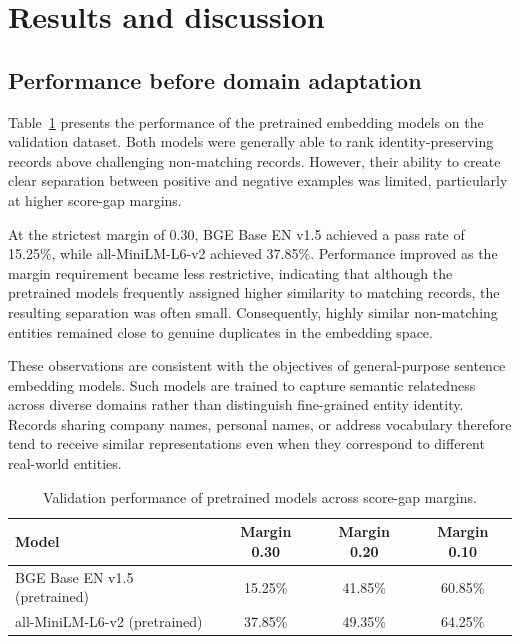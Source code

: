 \documentclass{article}
\begin{document}
\section{Results and discussion}
\label{sec:results}

\subsection{Performance before domain adaptation}

Table~\ref{tab:pretrained} presents the performance of the pretrained embedding models on the validation dataset. Both models were generally able to rank identity-preserving records above challenging non-matching records. However, their ability to create clear separation between positive and negative examples was limited, particularly at higher score-gap margins.

At the strictest margin of 0.30, BGE Base EN v1.5 achieved a pass rate of 15.25\%, while all-MiniLM-L6-v2 achieved 37.85\%. Performance improved as the margin requirement became less restrictive, indicating that although the pretrained models frequently assigned higher similarity to matching records, the resulting separation was often small. Consequently, highly similar non-matching entities remained close to genuine duplicates in the embedding space.

These observations are consistent with the objectives of general-purpose sentence embedding models. Such models are trained to capture semantic relatedness across diverse domains rather than distinguish fine-grained entity identity. Records sharing company names, personal names, or address vocabulary therefore tend to receive similar representations even when they correspond to different real-world entities.

\begin{table}[t]
  \caption{Validation performance of pretrained models across score-gap margins.}
  \label{tab:pretrained}
  \centering
  \begin{tabular}{lccc}
    \toprule
    Model & Margin 0.30 & Margin 0.20 & Margin 0.10 \\
    \midrule
    BGE Base EN v1.5 (pretrained)    & 15.25\% & 41.85\% & 60.85\% \\
    all-MiniLM-L6-v2 (pretrained)   & 37.85\% & 49.35\% & 64.25\% \\
    \bottomrule
  \end{tabular}
\end{table}
\end{document}
